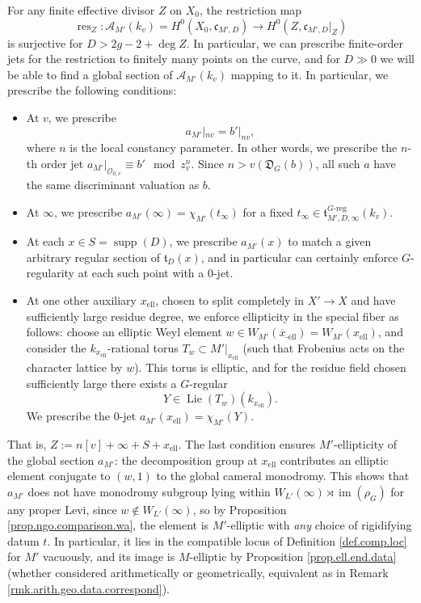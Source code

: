 \documentclass[openany]{amsbook}
\theoremstyle{definition}
\theoremstyle{remark}
\numberwithin{equation}{section}
\renewcommand{\O}{\mathcal{O}}
\newcommand{\cA}{\mathcal{A}}
\newcommand{\im}{\operatorname{im}}
\newcommand{\ol}[1]{\overline{#1}}
\renewcommand{\-}{\operatorname{-}}
\newcommand{\res}{\operatorname{res}}
\newcommand{\on}[1]{\operatorname{#1}}
\newcommand{\el}{\text{-ell}}
\newcommand{\ft}{\mathfrak{t}}
\newcommand{\fc}{\mathfrak{c}}
\newcommand{\fD}{\mathfrak{D}}
\newcommand{\Greg}{G\text{-reg}}
\newcommand{\Lie}{\on{Lie}}
\begin{document}
For any finite effective divisor $Z$ on $X_0$, the restriction map
$$
    \res_Z : \cA_{M'}(k_v) = H^0(X_0, \fc_{M',D}) \to H^0(Z, \fc_{M',D}|_Z)
$$
is surjective for $D > 2g - 2 + \deg Z$. In particular, we can prescribe finite-order jets for the restriction to finitely many points on the curve, and for $D \gg 0$ we will be able to find a global section of $\cA_{M'}(k_v)$ mapping to it. In particular, we prescribe the following conditions:
\begin{itemize}
    \item At $v$, we prescribe $$a_{M'}|_{nv} = b'|_{nv},$$
    where $n$ is the local constancy parameter. In other words, we prescribe the $n$-th order jet $a_{M'}|_{\O_{0,v}} \equiv b' \mod z_v^n$. Since $n > v(\fD_G(b))$, all such $a$ have the same discriminant valuation as $b$.
    \item At $\infty$, we prescribe $a_{M'}(\infty) = \chi_{M'}(t_\infty)$ for a fixed $t_\infty \in \ft_{M',D,\infty}^{\Greg}(k_v)$.
    \item At each $x \in S = \on{supp}(D)$, we prescribe $a_{M'}(x)$ to match a given arbitrary regular section of $\ft_{D}(x)$, and in particular can certainly enforce $G$-regularity at each such point with a 0-jet.
    \item At one other auxiliary $x_{\mathrm{ell}}$, chosen to split completely in $X' \to X$ and have sufficiently large residue degree, we enforce ellipticity in the special fiber as follows: choose an elliptic Weyl element $w \in W_{M'}(\ol{x}_{\el}) = W_{M'}(x_{\mathrm{ell}})$, and consider the $k_{x_{\mathrm{ell}}}$-rational torus $T_w \subset M'|_{x_{\mathrm{ell}}}$ (such that Frobenius acts on the character lattice by $w$). This torus is elliptic, and for the residue field chosen sufficiently large there exists a $G$-regular
    $$
        Y \in \Lie(T_w)(k_{x_{\mathrm{ell}}}).
    $$
    We prescribe the 0-jet $a_{M'}(x_{\mathrm{ell}}) = \chi_{M'}(Y)$.
\end{itemize}
That is, $Z := n[v] + \infty + S + x_{\mathrm{ell}}$. The last condition ensures $M'$-ellipticity of the global section $a_{M'}$: the decomposition group at $x_{\mathrm{ell}}$ contributes an elliptic element conjugate to $(w,1)$ to the global cameral monodromy. This shows that $a_{M'}$ does not have monodromy subgroup lying within $W_{L'}(\infty) \rtimes \im(\rho_G)$ for any proper Levi, since $w \not\in W_{L'}(\infty)$, so by Proposition \ref{prop.ngo.comparison.wa}, the element is $M'$-elliptic with \emph{any} choice of rigidifying datum $t$. In particular, it lies in the compatible locus of Definition \ref{def.comp.loc} for $M'$ vacuously, and its image is $M$-elliptic by Proposition \ref{prop.ell.end.data} (whether considered arithmetically or geometrically, equivalent as in Remark \ref{rmk.arith.geo.data.correspond}).
\end{document}
